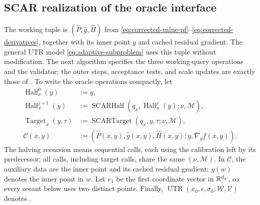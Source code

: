 \documentclass{article}
\begin{document}
\subsection{SCAR realization of the oracle interface}

The working tuple is $(\widehat P,\widehat g,\widehat H)$ from
\eqref{eq:corrected-value-pf}--\eqref{eq:corrected-derivatives},
together with its inner point $y$ and cached residual gradient.
The general UTR model \eqref{eq:adaptive-subproblem} uses this tuple
without modification.  The next algorithm specifies the three
working-query operations and the validator; the outer steps,
acceptance tests, and scale updates are exactly those of
.
To write the oracle operations compactly, let
\begin{equation}\label{eq:minimax-scar-notation}
\begin{aligned}
 \operatorname{Half}_x^0(y)&:=y,\\
 \operatorname{Half}_x^{j+1}(y)
   &:=\operatorname{SCARHalf}
       (q_x,\operatorname{Half}_x^j(y);\nu,\mathcal M),\\
 \operatorname{Target}_x(y,\tau)
   &:=\operatorname{SCARTarget}(q_x,y,\tau;\nu,\mathcal M),\\
 \mathcal C(x,y)&:=
   (\widehat P(x,y),\widehat g(x,y),\widehat H(x,y);
      y,\nabla_yf(x,y)).
\end{aligned}
\end{equation}
The halving recursion means sequential calls, each using the
calibration left by its predecessor; all calls, including target
calls, share the same $(\nu,\mathcal M)$.  In $\mathcal C$, the
auxiliary data are the inner point and its cached residual gradient;
$y(w)$ denotes the inner point in $w$.  Let $e_1$ be the first
coordinate vector in $\mathbb{R}^{d_y}$, so every secant below uses two
distinct points.  Finally, $\operatorname{UTR}(x_0,\epsilon,
\sigma_0;\mathcal W,\mathcal V)$ denotes .
\end{document}
